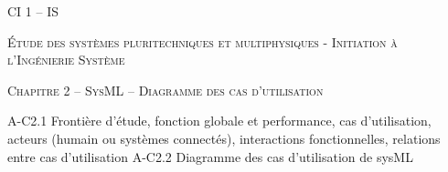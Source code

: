 \documentclass[11pt,oneside]{article}
\begin{document}
\pagestyle{fancy}
\renewcommand{\headrulewidth}{0pt}

\fancyhead{}


\fancyhead[C]{\rule{12cm}{.5pt}}


\renewcommand{\footrulewidth}{0.2pt}

\fancyfoot[C]{\footnotesize{\bfseries \thepage}}



\begin{center}
 \huge\textsc{CI 1 -- IS}

 \large\textsc{Étude des systèmes pluritechniques et multiphysiques - Initiation à l'Ingénierie Système}
\end{center}

\begin{center}
 \LARGE\textsc{Chapitre 2 -- SysML -- Diagramme des cas d'utilisation}
\end{center}


\vspace{.5cm}

A-C2.1	Frontière d'étude, fonction globale et performance, cas d’utilisation, acteurs (humain ou systèmes connectés), interactions fonctionnelles, relations entre cas d’utilisation	
A-C2.2	Diagramme des cas d’utilisation de sysML	
\end{document}
